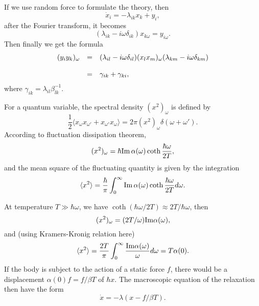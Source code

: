 \documentclass{book}
\newcommand{\average}[1]{\langle#1\rangle}
\renewcommand{\Im}{{\rm Im}}
\numberwithin{equation}{section}
\begin{document}
If we use random force to formulate the theory, then 
\begin{equation}
  \dot{x}_i=-\lambda_{ik}x_k+y_i,
\end{equation}
after the Fourier transform, it becomes
\begin{equation}
  (\lambda_{ik}-i\omega\delta_{ik})x_{k\omega}=y_{i\omega}.
\end{equation}
Then finally we get the formula
\begin{equation}
  \begin{array}{rcl}
  (y_iy_k)_\omega&=&(\lambda_{il}-i\omega\delta_{il})(x_lx_m)_\omega
  (\lambda_{km}-i\omega\delta_{km})\\\vbox to 20pt{}
  &=&\gamma_{ik}+\gamma_{ki},
  \end{array}
\end{equation}
where $\gamma_{ik}=\lambda_{il}\beta^{-1}_{lk}.$

For a quantum variable, the spectral density $(x^2)_\omega$ is defined by
\begin{equation}
  \frac{1}{2}\average{x_\omega x_{\omega'}+x_{\omega'}x_\omega}=
  2\pi(x^2)_\omega\delta(\omega+\omega').
\end{equation}
According to fluctuation dissipation theorem, 
\begin{equation}
  (x^2)_\omega=\hbar\Im\,\alpha(\omega)\coth\frac{\hbar\omega}{2T},
\end{equation}
and the mean square of the fluctuating quantity is given by the
integration
\begin{equation}
  \average{x^2}=\frac{\hbar}{\pi}\int_0^\infty\Im\,\alpha(\omega)
  \coth\frac{\hbar\omega}{2T}d\omega.
\end{equation}

At temperature $T\gg\hbar\omega$, we have
$\coth(\hbar\omega/2T)\approx2T/\hbar\omega$, then
\begin{equation}
  (x^2)_\omega=(2T/\omega)\Im\alpha(\omega),
\end{equation}
and (using Kramers-Kronig relation here)
\begin{equation}
  \average{x^2}=\frac{2T}{\pi}\int_0^\infty
  \frac{\Im\alpha(\omega)}{\omega}d\omega=
  T\alpha(0).
\end{equation}
If the body is subject to the action of a static force $f$, there
would be a displacement $\alpha(0)f=f/\beta T$ of $\hbar{x}$. The
macroscopic equation of the relaxation then have the form 
\begin{equation}
  \dot{x}=-\lambda(x-f/\beta T).
\end{equation}
\end{document}
